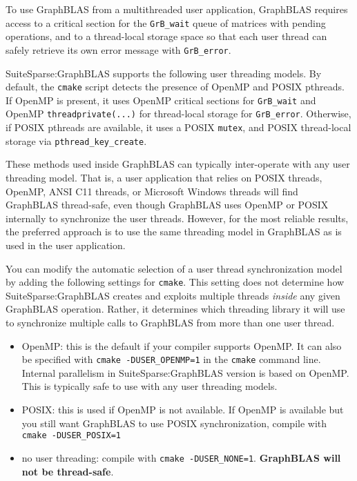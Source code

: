 \documentclass[12pt]{article}
\begin{document}
To use GraphBLAS from a multithreaded user application, GraphBLAS
requires access to a critical section for the \verb'GrB_wait' queue of
matrices with pending operations, and to a thread-local storage space
so that each user thread can safely retrieve its own error message with
\verb'GrB_error'.

SuiteSparse:GraphBLAS supports the following user threading models.  By
default, the \verb'cmake' script detects the presence of OpenMP and POSIX
pthreads.  If OpenMP is present, it uses OpenMP critical sections for
\verb'GrB_wait' and OpenMP \verb'threadprivate(...)' for thread-local storage
for \verb'GrB_error'.  Otherwise, if POSIX pthreads are available, it uses a
POSIX \verb'mutex', and POSIX thread-local storage via
\verb'pthread_key_create'.

These methods used inside GraphBLAS can typically inter-operate with any user
threading model.  That is, a user application that relies on POSIX threads,
OpenMP, ANSI C11 threads, or Microsoft Windows threads will find GraphBLAS
thread-safe, even though GraphBLAS uses OpenMP or POSIX internally to
synchronize the user threads.  However, for the most reliable results, the
preferred approach is to use the same threading model in GraphBLAS as is used
in the user application.

You can modify the automatic selection of a user thread synchronization model
by adding the following settings for \verb'cmake'.  This setting does not
determine how SuiteSparse:GraphBLAS creates and exploits multiple threads {\em
inside} any given GraphBLAS operation. Rather, it determines which threading
library it will use to synchronize multiple calls to GraphBLAS from more than
one user thread.

\begin{itemize}
\item OpenMP: this is the default if your compiler supports OpenMP.
    It can also be specified with \verb'cmake -DUSER_OPENMP=1' in the
    \verb'cmake' command line.  Internal parallelism in
    SuiteSparse:GraphBLAS version is based on OpenMP.  This is
    typically safe to use with any user threading models.

\item POSIX: this is used if OpenMP is not available.
    If OpenMP is available but you still want GraphBLAS to use POSIX
    synchronization, compile with \verb'cmake -DUSER_POSIX=1'

\item no user threading:  compile with \verb'cmake -DUSER_NONE=1'.
    {\bf GraphBLAS will not be thread-safe}.

\end{itemize}
\end{document}
